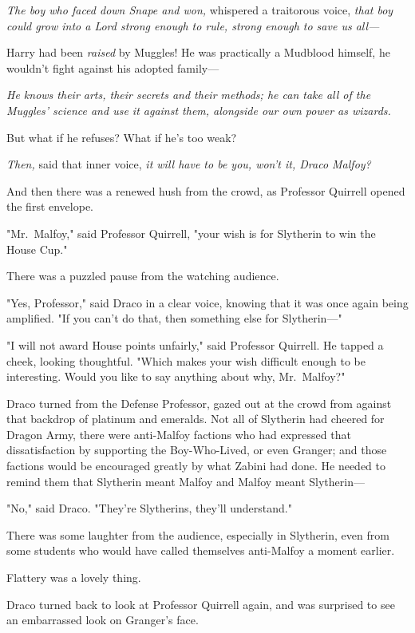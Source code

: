 \emph{The boy who faced down Snape and won,} whispered a traitorous voice,
\emph{that boy could grow into a Lord strong enough to rule, strong enough to
save us all---}

Harry had been \emph{raised} by Muggles! He was practically a Mudblood himself,
he wouldn't fight against his adopted family---

\emph{He knows their arts, their secrets and their methods; he can take all of
the Muggles' science and use it against them, alongside our own power as
wizards.}

But what if he refuses? What if he's too weak?

\emph{Then,} said that inner voice, \emph{it will have to be you, won't it,
Draco Malfoy?}

And then there was a renewed hush from the crowd, as Professor Quirrell opened
the first envelope.

"Mr.~Malfoy," said Professor Quirrell, "your wish is for{\el} Slytherin to
win the House Cup."

There was a puzzled pause from the watching audience.

"Yes, Professor," said Draco in a clear voice, knowing that it was once again
being amplified. "If you can't do that, then something else for Slytherin\mbox{---}"

"I will not award House points unfairly," said Professor Quirrell. He tapped a
cheek, looking thoughtful. "Which makes your wish difficult enough to be
interesting. Would you like to say anything about why, Mr.~Malfoy?"

Draco turned from the Defense Professor, gazed out at the crowd from against
that backdrop of platinum and emeralds. Not all of Slytherin had cheered for
Dragon Army, there were anti-Malfoy factions who had expressed that
dissatisfaction by supporting the Boy-Who-Lived, or even Granger; and those
factions would be encouraged greatly by what Zabini had done. He needed to
remind them that Slytherin meant Malfoy and Malfoy meant Slytherin---

"No," said Draco. "They're Slytherins, they'll understand."

There was some laughter from the audience, especially in Slytherin, even from
some students who would have called themselves anti-Malfoy a moment earlier.

Flattery was a lovely thing.

Draco turned back to look at Professor Quirrell again, and was surprised to see
an embarrassed look on Granger's face.

